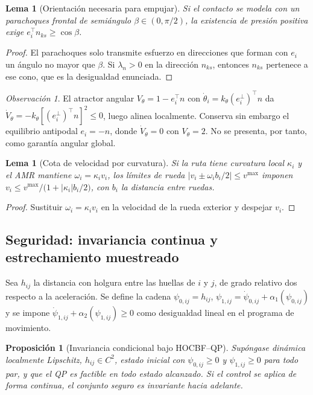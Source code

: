 \documentclass[11pt,a4paper]{article}
\theoremstyle{plain}
\newtheorem{proposicion}[teorema]{Proposición}
\newtheorem{lema}[teorema]{Lema}
\theoremstyle{definition}
\theoremstyle{remark}
\newtheorem{observacion}[teorema]{Observación}
\newcommand{\T}{^{\!\top}}
\begin{document}
\begin{lema}[Orientación necesaria para empujar]
\label{le:orientacion}
Si el contacto se modela con un parachoques frontal de semiángulo
$\beta\in(0,\pi/2)$, la existencia de presión positiva exige
$e_i\T n_{ks}\ge\cos\beta$.
\end{lema}

\begin{proof}
El parachoques solo transmite esfuerzo en direcciones que forman con $e_i$ un
ángulo no mayor que $\beta$. Si $\lambda_n>0$ en la dirección $n_{ks}$,
entonces $n_{ks}$ pertenece a ese cono, que es la desigualdad enunciada.
\end{proof}

\begin{observacion}
\label{obs:antipodal}
El atractor angular $V_\theta=1-e_i\T n$ con
$\dot\theta_i=k_\theta(e_i^{\perp})\T n$ da
$\dot V_\theta=-k_\theta[(e_i^{\perp})\T n]^{2}\le0$, luego alinea localmente.
Conserva sin embargo el equilibrio antipodal $e_i=-n$, donde
$\dot V_\theta=0$ con $V_\theta=2$. No se presenta, por tanto, como garantía
angular global.
\end{observacion}

\begin{lema}[Cota de velocidad por curvatura]
\label{le:curvatura}
Si la ruta tiene curvatura local $\kappa_i$ y el AMR mantiene
$\omega_i=\kappa_i v_i$, los límites de rueda
$|v_i\pm\omega_i b_i/2|\le v^{\max}$ imponen
$v_i\le v^{\max}/\big(1+|\kappa_i|b_i/2\big)$, con $b_i$ la distancia entre
ruedas.
\end{lema}

\begin{proof}
Sustituir $\omega_i=\kappa_i v_i$ en la velocidad de la rueda exterior y
despejar $v_i$.
\end{proof}

\subsection{Seguridad: invariancia continua y estrechamiento muestreado}

Sea $h_{ij}$ la distancia con holgura entre las huellas de $i$ y $j$, de grado
relativo dos respecto a la aceleración. Se define la cadena
$\psi_{0,ij}=h_{ij}$, $\psi_{1,ij}=\dot\psi_{0,ij}+\alpha_1(\psi_{0,ij})$ y se
impone $\dot\psi_{1,ij}+\alpha_2(\psi_{1,ij})\ge0$ como desigualdad lineal en el
programa de movimiento.

\begin{proposicion}[Invariancia condicional bajo HOCBF--QP]
\label{pr:hocbf}
Supóngase dinámica localmente Lipschitz, $h_{ij}\in C^2$, estado inicial con
$\psi_{0,ij}\ge0$ y $\psi_{1,ij}\ge0$ para todo par, y que el QP es factible en
todo estado alcanzado. Si el control se aplica de forma continua, el conjunto
seguro es invariante hacia adelante.
\end{proposicion}
\end{document}
